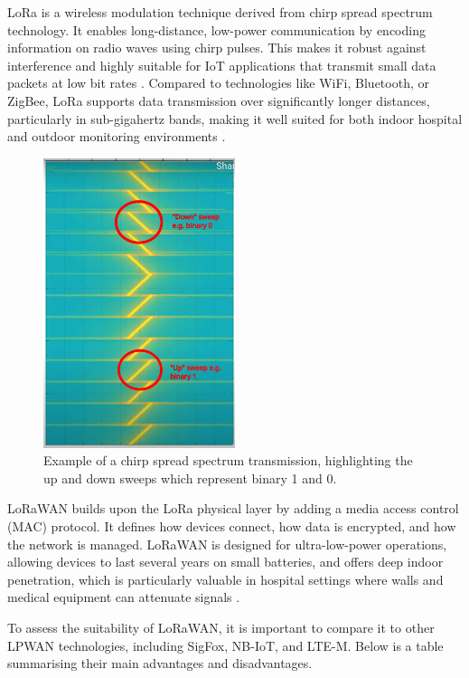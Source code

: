 LoRa is a wireless modulation technique derived from chirp spread spectrum technology. It enables long-distance, low-power communication by encoding information on radio waves using chirp pulses. This makes it robust against interference and highly suitable for IoT applications that transmit small data packets at low bit rates \cite{what_are_lora_lorawan}. Compared to technologies like WiFi, Bluetooth, or ZigBee, LoRa supports data transmission over significantly longer distances, particularly in sub-gigahertz bands, making it well suited for both indoor hospital and outdoor monitoring environments \cite{lora_documentation}.
\begin{figure}[H]
\centering
\includegraphics[width=0.5\textwidth]{images/chirp_spread_spectrum_labeled.png}
\caption{Example of a chirp spread spectrum transmission, highlighting the up and down sweeps which represent binary 1 and 0. \cite{Wenner2017-hd}}
\label{fig:chirp_spread_spectrum_labeled}
\end{figure}

LoRaWAN builds upon the LoRa physical layer by adding a media access control (MAC) protocol. It defines how devices connect, how data is encrypted, and how the network is managed. LoRaWAN is designed for ultra-low-power operations, allowing devices to last several years on small batteries, and offers deep indoor penetration, which is particularly valuable in hospital settings where walls and medical equipment can attenuate signals \cite{lora_documentation}.

To assess the suitability of LoRaWAN, it is important to compare it to other LPWAN technologies, including SigFox, NB-IoT, and LTE-M. Below is a table summarising their main advantages and disadvantages.


